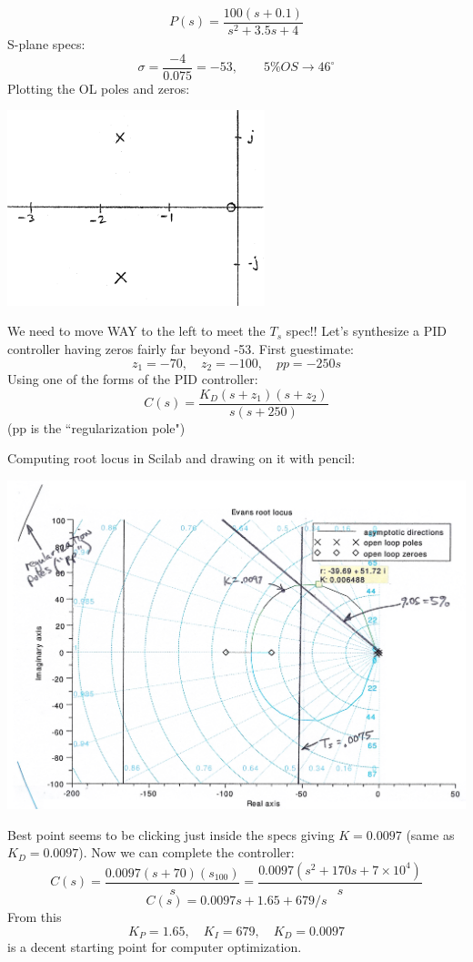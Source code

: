 \documentclass{article}	%
\begin{document}
\begin{solution}
\[
P(s) = \frac{100(s+0.1)}{s^2+3.5s+4}
\]
S-plane specs:
\[
\sigma = \frac {-4} {0.075} = -53, \qquad 5\%OS \to 46^\circ
\]
Plotting the OL poles and zeros:

\includegraphics[width=75mm]{00956a.png}

We need to move WAY to the left to meet the $T_s$ spec!!    Let's synthesize a PID controller having zeros fairly far beyond -53.   First guestimate:
\[
z_1 = -70, \quad z_2  = -100, \quad pp = -250s
\]
Using one of the forms of the PID controller:
\[
C(s) = \frac  {K_D(s+z_1)(s+z_2)}   {s(s+250)}
\]
(pp is the ``regularization pole")

Computing root locus in Scilab and drawing on it with pencil:


\includegraphics[width=150mm]{00957a.png}

Best point seems to be clicking just inside the specs giving $K= 0.0097$ (same as $K_D = 0.0097$).  Now we can complete the controller:
\[
C(s) = \frac{0.0097(s+70)(s_100)}{s} = \frac{0.0097(s^2+170s+7\times10^4)}{s}
\]
\[
C(s) = 0.0097s + 1.65 + 679/s
\]
From this
\[
K_P = 1.65,\quad K_I=679,\quad K_D=0.0097
\]
is a decent starting point for computer optimization.
\end{solution}
\end{document}
